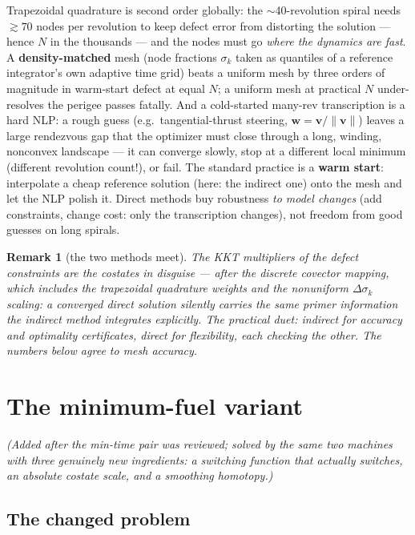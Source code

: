 \documentclass[11pt,letterpaper]{article}
\theoremstyle{noteplain}
\newtheorem*{remark}{Remark}
\newcommand{\vvec}{\mathbf{v}}
\begin{document}
Trapezoidal quadrature is second order globally: the $\sim$40-revolution
spiral needs $\gtrsim 70$ nodes per revolution to keep defect error from
distorting the solution --- hence $N$ in the thousands --- and the nodes
must go \emph{where the dynamics are fast}. A \textbf{density-matched}
mesh (node fractions $\sigma_k$ taken as quantiles of a reference
integrator's own adaptive time grid) beats a uniform mesh by three orders
of magnitude in warm-start defect at equal $N$; a uniform mesh at
practical $N$ under-resolves the perigee passes fatally. And a cold-started many-rev
transcription is a hard NLP: a rough guess (e.g.\ tangential-thrust
steering, $\mathbf w = \vvec/\|\vvec\|$) leaves a large rendezvous gap that
the optimizer must close through a long, winding, nonconvex landscape ---
it can converge slowly, stop at a different local minimum (different
revolution count!), or fail. The standard practice is a \textbf{warm start}:
interpolate a cheap reference solution (here: the indirect one) onto the
mesh and let the NLP polish it. Direct methods buy robustness \emph{to
model changes} (add constraints, change cost: only the transcription
changes), not freedom from good guesses on long spirals.

\begin{remark}[the two methods meet]
The KKT multipliers of the defect constraints are the costates in disguise
--- after the discrete covector mapping, which includes the trapezoidal
quadrature weights and the nonuniform $\Delta\sigma_k$ scaling: a
converged direct solution silently carries
the same primer information the indirect method integrates explicitly. The
practical duet: indirect for accuracy and optimality certificates, direct
for flexibility, each checking the other. The numbers below agree to mesh
accuracy.
\end{remark}

\section{The minimum-fuel variant}\label{sec:minfuel}

\emph{(Added after the min-time pair was reviewed; solved by the same two
machines with three genuinely new ingredients: a switching function that
actually switches, an absolute costate scale, and a smoothing homotopy.)}

\subsection*{The changed problem}
\end{document}
